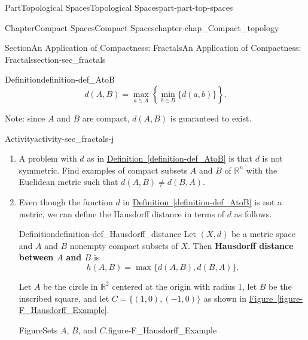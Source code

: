 \documentclass[oneside,10pt,]{book}
\newcommand{\xreffont}{\relax}
\newcommand{\terminology}[1]{\textbf{#1}}
\numberwithin{equation}{chapter}
\newcommand{\R}{\mathbb{R}}
\begin{document}
\begin{partptx}{Part}{Topological Spaces}{}{Topological Spaces}{}{}{part-part-top-spaces}
\begin{chapterptx}{Chapter}{Compact Spaces}{}{Compact Spaces}{}{}{chapter-chap_Compact_topology}
\begin{sectionptx}{Section}{An Application of Compactness: Fractals}{}{An Application of Compactness: Fractals}{}{}{section-sec_fractals}
\begin{definition}{Definition}{}{definition-def_AtoB}
\begin{equation*}
d(A,B) = \max_{a \in A} \left\{ \min_{b \in B} \{d(a,b)\} \right\}\text{.}
\end{equation*}
%
\end{definition}
Note: since \(A\) and \(B\) are compact, \(d(A,B)\) is guaranteed to exist.%
\begin{activity}{Activity}{}{activity-sec_fractals-j}%
\begin{enumerate}[font=\bfseries,label=(\alph*),ref=\alph*]%
\item{}A problem with \(d\) as in \hyperref[definition-def_AtoB]{Definition~{\xreffont\ref{definition-def_AtoB}}} is that \(d\) is not symmetric. Find examples of compact subsets \(A\) and \(B\) of \(\R^n\) with the Euclidean metric such that \(d(A,B) \neq d(B,A)\).%
\item{}Even though the function \(d\) in \hyperref[definition-def_AtoB]{Definition~{\xreffont\ref{definition-def_AtoB}}} is not a metric, we can define the Hausdorff distance  in terms of \(d\) as follows.%
\begin{definition}{Definition}{}{definition-def_Hausdorff_distance}%
%
Let \((X,d)\) be a metric space and \(A\) and \(B\) nonempty compact subsets of \(X\). Then \terminology{Hausdorff distance between \(A\) and \(B\)} is%
\begin{equation*}
h(A,B) = \max\{d(A,B), d(B,A)\}\text{.}
\end{equation*}
%
\end{definition}
Let \(A\) be the circle in \(\R^2\) centered at the origin with radius 1, let \(B\) be the inscribed square, and let \(C = \{(1,0), (-1,0)\}\) as shown in \hyperref[figure-F_Hausdorff_Example]{Figure~{\xreffont\ref{figure-F_Hausdorff_Example}}}.%
\begin{figureptx}{Figure}{Sets \(A\), \(B\), and \(C\).}{figure-F_Hausdorff_Example}{}%
\begin{image}{0.25}{0.5}{0.25}{}%

\end{image}
\end{figureptx}
\end{enumerate}
\end{activity}
\end{sectionptx}
\end{chapterptx}
\end{partptx}
\end{document}
